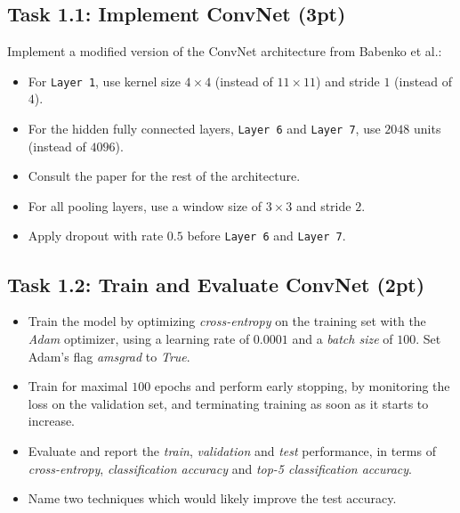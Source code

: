 \documentclass[a4paper,twoside,10pt]{article}
\begin{document}
	\subsection*{Task 1.1:  Implement ConvNet (3pt)}
	Implement a modified version of the ConvNet architecture from Babenko et al.:
	\begin{itemize}
		\item For \verb!Layer 1!, use kernel size $4 \times 4$ (instead of $11 \times 11$) and stride $1$ (instead of $4$).
		\item For the hidden fully connected layers, \verb!Layer 6! and \verb!Layer 7!, use $2048$ units (instead of $4096$).
		\item Consult the paper for the rest of the architecture.
		\item For all pooling layers, use a window size of $3 \times 3$ and stride $2$.
		\item Apply dropout with rate $0.5$ before \verb!Layer 6! and \verb!Layer 7!.
	\end{itemize}
	
	
	\subsection*{Task 1.2:  Train and Evaluate ConvNet (2pt)}
	\begin{itemize}
		\item Train the model by optimizing \emph{cross-entropy} on the training set with the \emph{Adam} optimizer, using a learning rate of $0.0001$ and a \emph{batch size} of $100$. Set Adam's flag \emph{amsgrad} to \emph{True}.
		\item Train for maximal $100$ epochs and perform early stopping, by monitoring the loss on the validation set, and terminating training as soon as it starts to increase.
		\item Evaluate and report the \emph{train}, \emph{validation} and \emph{test} performance, in terms of \emph{cross-entropy}, \emph{classification accuracy} and \emph{top-5 classification accuracy}.
		\item Name two techniques which would likely improve the test accuracy.
	\end{itemize}
	
	
\end{document}
